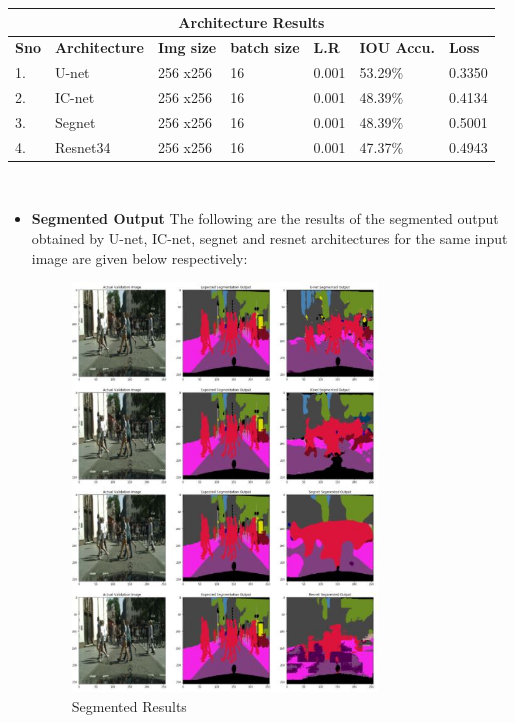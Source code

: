 \documentclass{IEEEtran}
\begin{document}
\begin{tabular}{ |p{0.6cm}|p{1.8cm}|p{0.6cm}|p{0.6cm}|p{0.6cm}|p{0.8cm}|p{0.8cm}|}
 \hline
 \multicolumn{7}{|c|}{\textbf{Architecture Results}} \\
 \hline
 \textbf{Sno} & \textbf{Architecture} & \textbf{Img size} & \textbf{batch size} & \textbf{L.R} & \textbf{IOU Accu.} & \textbf{Loss} \\
 \hline
 1. & U-net   & 256 x256    & 16  & 0.001 & 53.29\% & 0.3350 \\
 \hline
 2. & IC-net   & 256 x256    & 16 & 0.001 & 48.39\% & 0.4134 \\
 \hline
 3. & Segnet   & 256 x256    & 16  & 0.001 & 48.39\% & 0.5001 \\
 \hline
 4. & Resnet34   & 256 x256    & 16  & 0.001 & 47.37\% & 0.4943 \\
 \hline
\end{tabular}
\\
\begin{itemize}
    \item \textbf{Segmented Output}
The following are the results of the segmented output obtained by U-net, IC-net, segnet and resnet architectures for the same input image are given below respectively:
\begin{figure}[h]
    \centering
    \captionsetup{justification=centering}
    \includegraphics[width=8.1cm]{seg.JPG}
    \caption{Segmented Results}
    \label{fig:Binary class segmented output}
\end{figure}
\end{itemize}
\end{document}
